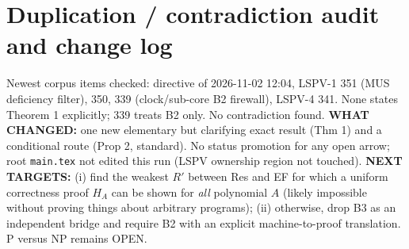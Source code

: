 \documentclass[11pt]{article}
\begin{document}
\section*{Duplication / contradiction audit and change log}
Newest corpus items checked: directive of 2026-11-02 12:04, LSPV-1 351 (MUS deficiency filter), 350, 339 (clock/sub-core B2 firewall), LSPV-4 341. None states Theorem 1 explicitly; 339 treats B2 only. No contradiction found. \textbf{WHAT CHANGED:} one new elementary but clarifying exact result (Thm 1) and a conditional route (Prop 2, standard). No status promotion for any open arrow; root \texttt{main.tex} not edited this run (LSPV ownership region not touched). \textbf{NEXT TARGETS:} (i) find the weakest $R'$ between Res and EF for which a uniform correctness proof $H_A$ can be shown for \emph{all} polynomial $A$ (likely impossible without proving things about arbitrary programs); (ii) otherwise, drop B3 as an independent bridge and require B2 with an explicit machine-to-proof translation. P versus NP remains OPEN.
\end{document}
